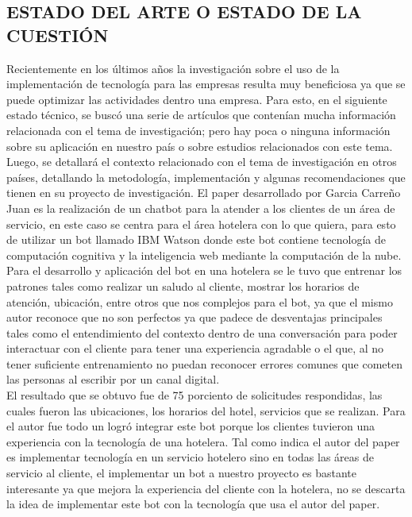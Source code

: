 \documentclass[12pt,a4paper,oneside]{article}
\begin{document}
\subsection{ESTADO DEL ARTE O ESTADO DE LA CUESTIÓN}

    Recientemente en los últimos años la investigación sobre el uso de la implementación de tecnología para las empresas resulta muy beneficiosa ya que se puede optimizar las actividades dentro una empresa. Para esto, en el siguiente estado técnico, se buscó una serie de artículos que contenían mucha información relacionada con el tema de investigación; pero hay poca o ninguna información sobre su aplicación en nuestro país o sobre estudios relacionados con este tema. Luego, se detallará el contexto relacionado con el tema de investigación en otros países, detallando la metodología, implementación y algunas recomendaciones que tienen en su proyecto de investigación.
    El paper desarrollado por Garcia Carreño Juan es la realización de un chatbot para la atender a los clientes de un área de servicio, en este caso se centra para el área hotelera con lo que quiera, para esto de utilizar un bot llamado IBM Watson donde este bot contiene tecnología de computación cognitiva y la inteligencia web mediante la computación de la nube. Para el desarrollo y aplicación del bot en una hotelera se le tuvo que entrenar los patrones tales como realizar un saludo al cliente, mostrar los horarios de atención, ubicación,  entre otros que nos complejos para el bot, ya que el mismo autor reconoce que no son perfectos ya que padece de desventajas principales tales como el entendimiento del contexto dentro de una conversación para poder interactuar con el cliente para tener una experiencia agradable o el que, al no tener suficiente entrenamiento no puedan reconocer errores comunes que cometen las personas al escribir por un canal digital.\\ El resultado que se obtuvo fue de 75 porciento de solicitudes respondidas, las cuales fueron las ubicaciones, los horarios del hotel, servicios que se realizan. Para el autor fue todo un logró integrar este bot porque los clientes tuvieron una experiencia con la tecnología de una hotelera. Tal como indica el autor del paper es implementar tecnología en un servicio hotelero sino en todas las áreas de servicio al cliente, el implementar un bot a nuestro proyecto es bastante interesante ya que mejora la experiencia del cliente con la hotelera, no se descarta la idea de implementar este bot con la tecnología que usa el autor del paper. 
\end{document}
